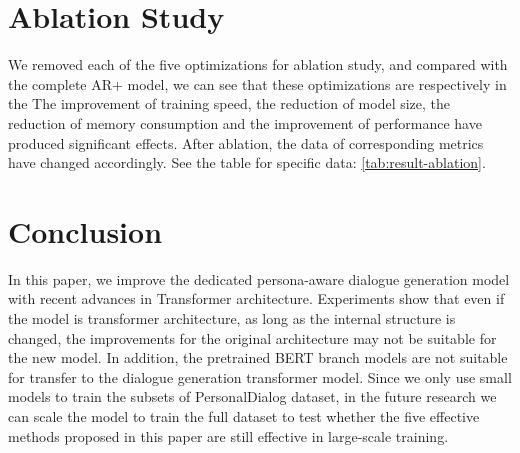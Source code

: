 \documentclass[letterpaper]{article} %
\begin{document}
\section[Ablation Study]{Ablation Study} 
We removed each of the five optimizations for ablation study, and compared with the complete AR+ model, we can see that these optimizations are respectively in the The improvement of training speed, the reduction of model size, the reduction of memory consumption and the improvement of performance have produced significant effects. After ablation, the data of corresponding metrics have changed accordingly. See the table for specific data: \ref{tab:result-ablation}.
 
\begin{table*} [b]
\centering
\caption{Ablation study results, bold data is degradation metric}
\label{tab:result-ablation}
\end{table*}
                     

\section[Conclusion]{Conclusion} 
In this paper, we improve the dedicated persona-aware dialogue generation model with recent advances in Transformer architecture. Experiments show that even if the model is transformer architecture, as long as the internal structure is changed, the improvements for the original architecture may not be suitable for the new model. In addition, the pretrained BERT branch models are not suitable for transfer to the dialogue generation transformer model. Since we only use small models to train the subsets of PersonalDialog dataset, in the future research we can scale the model to train the full dataset to test whether the five effective methods proposed in this paper are still effective in large-scale training. 




\end{document}
